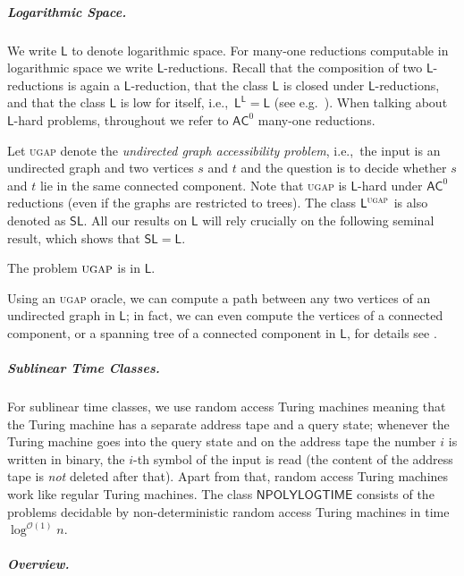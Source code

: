 \documentclass[anonymous,letter,UKenglish,cleveref,autoref,thm-restate]{lipics-v2021}
\newcommand{\ie}{i.e.,~}
\newcommand{\eg}{e.g.~}
\newcommand{\bigO}{\mathcal{O}}
\newcommand{\NPOLYLOGTIME}{\ensuremath{\mathsf{NPOLYLOGTIME}}\xspace}
\newcommand{\ACz}{\ensuremath{\mathsf{AC}^0}\xspace}
\newcommand{\LOGSPACE}{\ensuremath{\mathsf{L}}\xspace}
\newcommand{\SL}{\ensuremath{\mathsf{SL}}\xspace}
\theoremstyle{plain}
\theoremstyle{plain}
\newcommand{\prob}[1]{\textup{\textsc{#1}}\xspace}
\newcommand{\dUGAP}{\prob{ugap}}
\newcommand{\mysubparagraph}[1]{\vspace*{-2mm}\subparagraph*{#1}}
\begin{document}
\mysubparagraph{Logarithmic Space.}
We write \LOGSPACE to denote logarithmic space. For many-one reductions computable in logarithmic space we write \LOGSPACE-reductions.
Recall that the composition of two \LOGSPACE-reductions is again a \LOGSPACE-reduction, that the class \LOGSPACE is closed under \LOGSPACE-reductions, and that the class \LOGSPACE is low for itself, \ie $\LOGSPACE^\LOGSPACE = \LOGSPACE$ (see \eg \cite[Lemma 4.17]{AroBar09}).
When talking about \LOGSPACE-hard problems, throughout we refer to \ACz many-one reductions.

Let \dUGAP denote the \emph{undirected graph accessibility problem}, \ie the input is an undirected graph and two vertices $s$ and $t$ and the question is to decide whether  $s$ and $t$ lie in the same connected component.
Note that \dUGAP is \LOGSPACE-hard under \ACz reductions \cite{CookM87} (even if the graphs are restricted to trees).
 The class $ \LOGSPACE^{\dUGAP}$ is also denoted as \SL. 
All our results on \LOGSPACE will rely crucially on the following seminal result, which shows that $\SL = \LOGSPACE$.
\begin{theorem}
	The problem $\dUGAP$ is in $\LOGSPACE$.
\end{theorem}

\begin{remark}\label{rem:compute-path}
  Using an \dUGAP oracle, we can compute a path between any two vertices of an undirected graph in \LOGSPACE; in fact, we can even compute the vertices of a connected component, or a spanning tree of a connected component in \LOGSPACE, for details see \cite[Lemma 2.4]{NisanT95}.
\end{remark}



\mysubparagraph{Sublinear Time Classes.}

For sublinear time classes, we use random access Turing machines meaning that the Turing machine has a separate address tape and a query state; whenever the Turing machine goes into the query state and on the address tape the number $i$ is written in binary, the $i$-th symbol of the input is read (the content of the address tape is \emph{not} deleted after that).
Apart from that, random access Turing machines work like regular Turing machines.
The class \NPOLYLOGTIME consists of the problems decidable by non-deterministic random access Turing machines in time $\log^{\bigO(1)}n$.


\mysubparagraph{Overview.}
\end{document}

